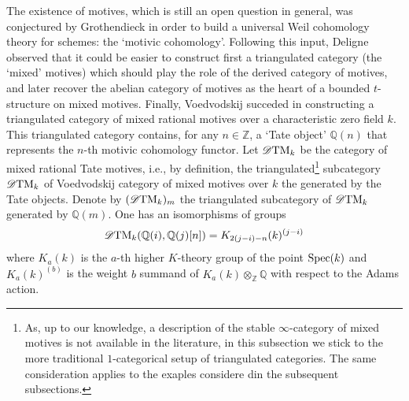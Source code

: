 \documentclass{article}
\theoremstyle{definition}
\newcommand{\Z}{\mathbb{Z}}
\begin{document}
The existence of motives, which is still an open question in general, was conjectured by Grothendieck in order to build a universal Weil cohomology theory for schemes: the `motivic cohomology'. Following this input, Deligne observed that it could be easier to construct first a triangulated category (the `mixed' motives) which should play the role of the derived category of motives, and later recover the abelian category of motives as the heart of a bounded $t$-structure on mixed motives. Finally, Voedvodskij succeded in constructing a triangulated category of mixed rational motives over a characteristic zero field $k$.
This triangulated category contains, for any $n \in \Z$, a `Tate object' $\mathbb{Q}(n)$ that represents the $n$-th motivic cohomology functor. Let $\mathscr{D}\textnormal{TM}_k$ be the category of mixed rational Tate motives, i.e., by definition, the triangulated\footnote{As, up to our knowledge, a description of the stable $\infty$-category of mixed motives is not available in the literature, in this subsection we stick to the more traditional $1$-categorical setup of triangulated categories. The same consideration applies to the exaples considere din the subsequent subsections.} subcategory $\mathscr{D}\textnormal{TM}_k$ of Voedvodskij category of mixed motives over $k$ the generated by the Tate objects.  Denote by $(\mathscr{D}\textnormal{TM}_k)_{m}$ the triangulated subcategory of $\mathscr{D}\textnormal{TM}_k$ generated by $\mathbb{Q}(m)$. One has an isomorphisms of groups
  \[
   \mathscr{D}\textnormal{TM}_k(\mathbb{Q}(i),\mathbb{Q}(j)[n])=K_{2(j-i)-n}(k)^{(j-i)}
   \]
   where $K_a(k)$ is the $a$-th higher $K$-theory group of the point $\textnormal{Spec}(k)$ and $K_a(k)^{(b)}$ is the weight $b$ summand of $K_a(k) \otimes_{\mathbb{Z}} \mathbb{Q}$ with respect to the Adams action. %
\end{document}
